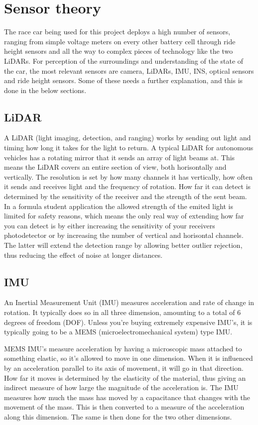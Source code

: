 \section{Sensor theory}
The race car being used for this project deploys a high number of sensors, ranging from simple voltage meters on every other battery cell through ride height sensors and all the way to complex pieces of technology like the two LiDARs. For perception of the surroundings and understanding of the state of the car, the most relevant sensors are camera, LiDARs, IMU, INS, optical sensors and ride height sensors. Some of these needs a further explanation, and this is done in the below sections.

\subsection{LiDAR}
A LiDAR (light imaging, detection, and ranging) works by sending out light and timing how long it takes for the light to return. A typical LiDAR for autonomous vehicles has a rotating mirror that it sends an array of light beams at. This means the LiDAR covers an entire section of view, both horisontally and vertically. The resolution is set by how many channels it has vertically, how often it sends and receives light and the frequency of rotation. How far it can detect is determined by the sensitivity of the receiver and the strength of the sent beam. In a formula student application the allowed strength of the emited light is limited for safety reasons, which means the only real way of extending how far you can detect is by either increasing the sensitivity of your receivers photodetector or by increasing the number of vertical and horisontal channels. The latter will extend the detection range by allowing better outlier rejection, thus reducing the effect of noise at longer distances. 

\subsection{IMU}
An Inertial Measurement Unit (IMU) measures acceleration and rate of change in rotation. It typically does so in all three dimension, amounting to a total of 6 degrees of freedom (DOF). Unless you're buying extremely expensive IMU's, it is typically going to be a MEMS (microelectromechanical system) type IMU. 

MEMS IMU's measure acceleration by having a microscopic mass attached to something elastic, so it's allowed to move in one dimension. When it is influenced by an acceleration parallel to its axis of movement, it will go in that direction. How far it moves is determined by the elasticity of the material, thus giving an indirect measure of how large the magnitude of the acceleration is. The IMU measures how much the mass has moved by a capacitance that changes with the movement of the mass. This is then converted to a measure of the acceleration along this dimension. The same is then done for the two other dimensions. 

